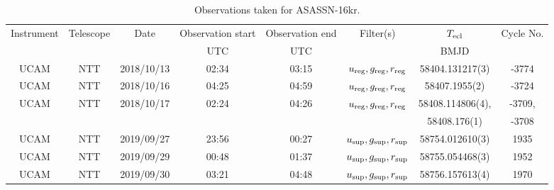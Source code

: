 \begin{table}
	\begin{center}
		\caption{Observations taken for ASASSN-16kr.}
		\label{table:observing:observation logs ASASSN-16kr}
		\begin{tabular}{cccccccc}
			\hline
			Instrument & Telescope & Date & Observation start & Observation end & Filter(s) & $T_{\rm ecl}$ & Cycle No. \\
			 &  &  & UTC & UTC &  & BMJD &  \\
			\hline
			\hline
			UCAM & NTT & 2018/10/13 & 02:34 & 03:15 & $u_{\rm reg},g_{\rm reg},r_{\rm reg}$ & 58404.131217(3)  & -3774  \\
			UCAM & NTT & 2018/10/16 & 04:25 & 04:59 & $u_{\rm reg},g_{\rm reg},r_{\rm reg}$ & 58407.1955(2)    & -3724  \\
			UCAM & NTT & 2018/10/17 & 02:24 & 04:26 & $u_{\rm reg},g_{\rm reg},r_{\rm reg}$ & 58408.114806(4), & -3709, \\
			     &     &            &       &       &                                       &  58408.176(1)    & -3708  \\
			UCAM & NTT & 2019/09/27 & 23:56 & 00:27 & $u_{\rm sup},g_{\rm sup},r_{\rm sup}$ & 58754.012610(3)  & 1935   \\
			UCAM & NTT & 2019/09/29 & 00:48 & 01:37 & $u_{\rm sup},g_{\rm sup},r_{\rm sup}$ & 58755.054468(3)  & 1952   \\
			UCAM & NTT & 2019/09/30 & 03:21 & 04:48 & $u_{\rm sup},g_{\rm sup},r_{\rm sup}$ & 58756.157613(4)  & 1970   \\
		   \hline
		\end{tabular}
	\end{center}
\end{table}